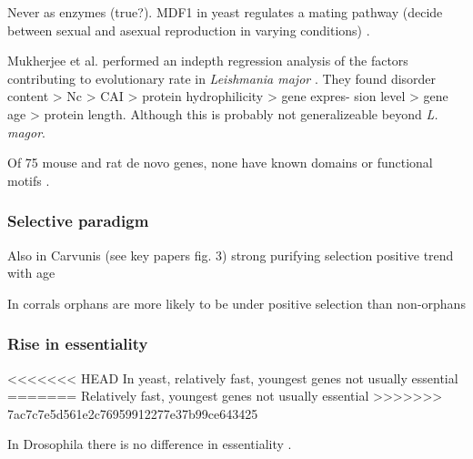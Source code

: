     Never as enzymes (true?). MDF1 in yeast regulates a mating pathway
    (decide between sexual and asexual reproduction in varying conditions)
    \cite{li_novo_2010}.

    Mukherjee et al. performed an indepth regression analysis of the factors
    contributing to evolutionary rate in \textit{Leishmania major}
    \cite{mukherjee_elucidating_2015}. They found disorder content > Nc > CAI >
    protein hydrophilicity > gene expres- sion level > gene age > protein length.
    Although this is probably not generalizeable beyond \textit{L.  magor}.

    Of 75 mouse and rat de novo genes, none have known domains or
    functional motifs \cite{murphy_novo_2012}.

  \subsubsection{Selective paradigm}


    Also in Carvunis (see key papers fig. 3) strong purifying selection
    positive trend with age \cite{carvunis_proto-genes_2012}


    In corrals orphans are more likely to be under positive selection
    than non-orphans \cite{voolstra_rapid_2011}


    \FloatBarrier

  \subsubsection{Rise in essentiality}

<<<<<<< HEAD
        In yeast, relatively fast, youngest genes not usually essential
        \cite{abrusan_integration_2013}
=======
    Relatively fast, youngest genes not usually essential
    \cite{abrusan_integration_2013}
>>>>>>> 7ac7c7e5d561e2c76959912277e37b99ce643425

    In Drosophila there is no difference in essentiality
    \cite{chen_new_2010}. 

